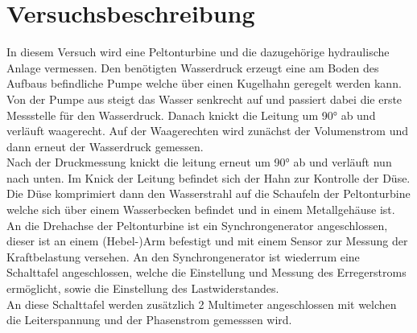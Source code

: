 \section{Versuchsbeschreibung}
\label{section:Versuchsbeschreibung}
%
In diesem Versuch wird eine Peltonturbine und die dazugehörige hydraulische Anlage vermessen.
Den benötigten Wasserdruck erzeugt eine am Boden des Aufbaus befindliche Pumpe welche über einen Kugelhahn geregelt werden kann.
Von der Pumpe aus steigt das Wasser senkrecht auf und passiert dabei die erste Messstelle für den Wasserdruck.
Danach knickt die Leitung um 90° ab und verläuft waagerecht. Auf der Waagerechten wird zunächst der Volumenstrom und dann erneut der Wasserdruck gemessen.\\
Nach der Druckmessung knickt die leitung erneut um 90° ab und verläuft nun nach unten. Im Knick der Leitung befindet sich der Hahn zur Kontrolle der Düse.
Die Düse komprimiert dann den Wasserstrahl auf die Schaufeln der Peltonturbine welche sich über einem Wasserbecken befindet und in einem Metallgehäuse ist.\\
An die Drehachse der Peltonturbine ist ein Synchrongenerator angeschlossen, dieser ist an einem (Hebel-)Arm befestigt und mit einem Sensor zur Messung der Kraftbelastung versehen.
An den Synchrongenerator ist wiederrum eine Schalttafel angeschlossen, welche die Einstellung und Messung des Erregerstroms ermöglicht, sowie die Einstellung des Lastwiderstandes.\\
An diese Schalttafel werden zusätzlich 2 Multimeter angeschlossen mit welchen die Leiterspannung und der Phasenstrom gemesssen wird.
%
